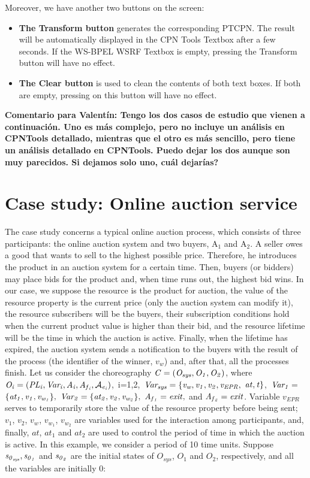 Moreover, we have another two buttons on the screen:

\begin{itemize}
\item{\textbf{The Transform button}
generates the corresponding PTCPN. The result will be automatically displayed in the CPN Tools Textbox after a few seconds. If the WS-BPEL WSRF Textbox is empty, pressing the Transform button will have no effect.}

\item{\textbf{The Clear button}
is used to clean the contents of both text boxes. If both are empty, pressing on this button will have no effect.}
\end{itemize}

{\bf Comentario para Valent\'in: Tengo los dos casos de estudio que vienen a continuaci\'on. Uno es m\'as complejo, pero no incluye un an\'alisis en CPNTools detallado, mientras que el otro es m\'as sencillo, pero tiene un an\'alisis detallado en CPNTools. Puedo dejar los dos aunque son muy parecidos. Si dejamos solo uno, cu\'al dejar\'ias?}
\section*{Case study: Online auction service}\label{cs}

The case study concerns a typical online auction process, which consists of three participants:
the online auction system and two buyers, A$_1$ and A$_2$. A seller owes a good that wants to sell to the highest possible price. Therefore, he introduces the product
in an auction system for a certain time. Then, buyers (or bidders) may place bids for the product and, when time runs out, the highest bid wins. In our case, we suppose the resource is the product for auction, the value of the resource property is the current price (only the auction system can modify it), the resource subscribers will be the buyers, their subscription conditions hold when the current product value is higher than their bid, and the resource lifetime will be the time in which the auction is active. Finally, when the lifetime has expired, the auction system sends a notification to the buyers with the result of the process (the identifier of the winner, $v_w$) and, after that, all the processes finish. Let us consider the choreography ${\it C=(O_{sys},O_1,O_2)}$, where 
${\it O_i=(PL_i,Var_i,A_i,A_{f{_i}},\mathcal{A}_{e{_i}})}$,~i=1,2,~${\it Var_{sys}=\{v_w,v_1,v_2,v_{EPR},}$
${\it at,t\}}$,~${\it Var_1= }$ \\ ${\it \{at_1,v_1,v_{w{_1}}\},\ Var_2=\{at_2,v_2,v_{w_{2}}\},\ A_{f{_1}}=exit,}$ and
${\it A_{f{_2}}=exit}$. Variable $v_{EPR}$ serves to temporarily store the value of the resource property before being sent; $v_1$, $v_2$, $v_{w_{}}$, $v_{w_{1}}$, $v_{w_{2}}$ are variables used for the interaction among participants, and, finally, $at$, $at_1$ and $at_2$ are used to control the period of time in which the auction is active. In this example, we consider a period of 10 time units. Suppose ${\it s_{0{_{sys}}}, s_{0{_1}}}$ and ${\it s_{0{_2}}}$ are the initial states of $O_{sys}$, $O_1$ and $O_2$, respectively, and all the variables are initially $0$: \\[-0.2cm]


